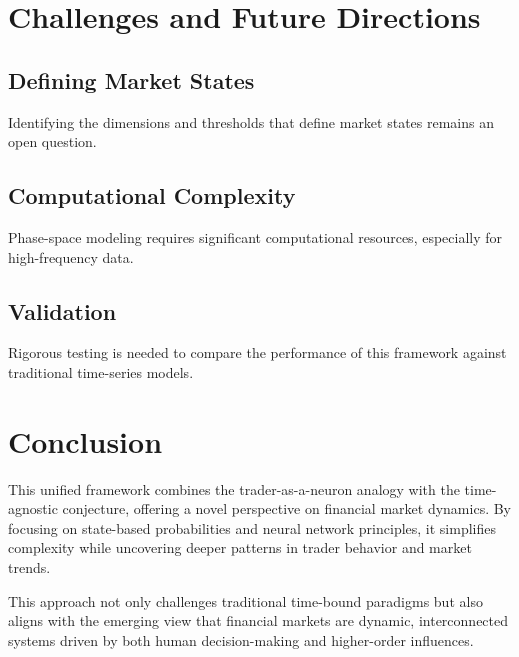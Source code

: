 \documentclass[a4]{article}
\begin{document}
\section{Challenges and Future Directions}

\subsection{Defining Market States}
Identifying the dimensions and thresholds that define market states remains an open question.

\subsection{Computational Complexity}
Phase-space modeling requires significant computational resources, especially for high-frequency data.

\subsection{Validation}
Rigorous testing is needed to compare the performance of this framework against traditional time-series models.


\section{Conclusion}

This unified framework combines the trader-as-a-neuron analogy with the time-agnostic conjecture, offering a novel perspective on financial market dynamics. By focusing on state-based probabilities and neural network principles, it simplifies complexity while uncovering deeper patterns in trader behavior and market trends.

This approach not only challenges traditional time-bound paradigms but also aligns with the emerging view that financial markets are dynamic, interconnected systems driven by both human decision-making and higher-order influences.
\end{document}
